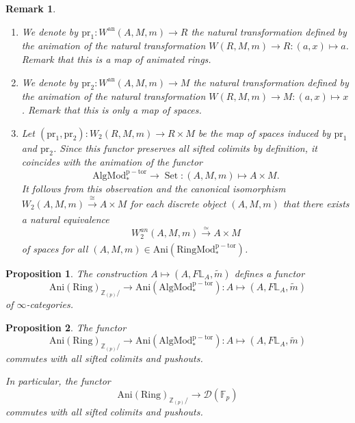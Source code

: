 \documentclass[10pt,a4paper]{amsart}
\newtheorem{remark}{Remark}
\newtheorem{prop}{Proposition}
\begin{document}
\begin{remark}\label{rem4.2}
    \begin{enumerate}
        \item We denote by $\mathrm{pr}_1:W^{\mathrm{an}}(A,M,m)\to R$ the natural transformation defined by the animation of the natural transformation $W(R,M,m)\to R:(a,x)\mapsto a$. Remark that this is a map of animated rings.
        \item We denote by $\mathrm{pr}_2:W^{\mathrm{an}}(A,M,m)\to M$ the natural transformation defined by the animation of the natural transformation $W(R,M,m)\to M:(a,x)\mapsto x$. Remark that this is only a map of spaces.
        \item Let $(\mathrm{pr}_1,\mathrm{pr}_2):W_2(R,M,m)\to R\times M$ be the map of spaces induced by $\mathrm{pr}_1$ and $\mathrm{pr}_2$. Since this functor preserves all sifted colimits by definition, it coincides with the animation of the functor \[\operatorname{AlgMod_*^{p-tor}}\to \operatorname{Set}:(A,M,m)\mapsto A\times M.\]  It follows from this observation and the canonical isomorphism $W_2(A,M,m)\xrightarrow[]{\cong}A\times M$ for each discrete object $(A,M,m)$ that there exists a natural equivalence \[W_2^{an}(A,M,m)\xrightarrow[]{\simeq } A\times M\] of spaces for all $(A,M,m)\in \operatorname{Ani(RingMod_*^{p-tor})}$.
    \end{enumerate}
\end{remark}

\begin{prop}\label{pro4.8.1}
    The construction $A\mapsto (A,F\mathbb L_A,\widetilde m)$ defines a functor \[\operatorname{Ani(Ring)}_{\mathbb Z_{(p)}/}\to \operatorname{Ani(AlgMod_{*}^{p-tor})}:A\mapsto (A,F\mathbb L_A,\widetilde m)\] of $\infty$-categories.
\end{prop}

\begin{prop}\label{pro4.10.1}
    The functor \[\operatorname{Ani(Ring)}_{\mathbb Z_{(p)}/}\to \operatorname{Ani(AlgMod_{*}^{p-tor})}:A\mapsto (A,F\mathbb L_A,\widetilde m)\] commutes with all sifted colimits and pushouts.

    In particular, the functor 
    \[\operatorname{Ani(Ring)}_{\mathbb Z_{(p)}/}\to \mathcal D(\mathbb F_p)\] commutes with all sifted colimits and pushouts.
\end{prop}
\end{document}
